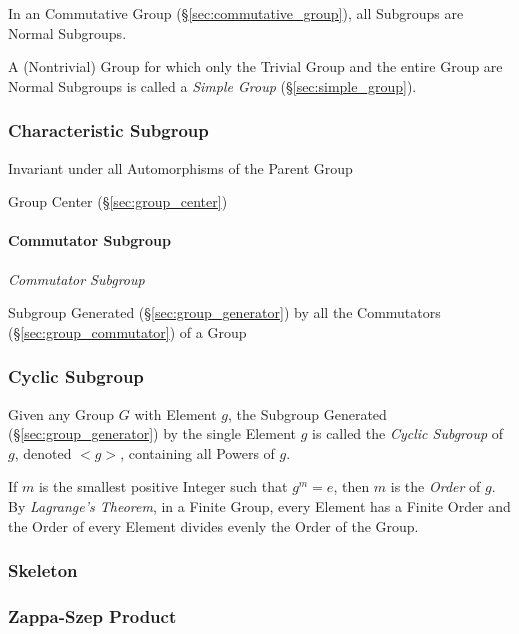In an Commutative Group (\S\ref{sec:commutative_group}), all Subgroups are
Normal Subgroups.

A (Nontrivial) Group for which only the Trivial Group and the entire Group are
Normal Subgroups is called a \emph{Simple Group} (\S\ref{sec:simple_group}).



\subsubsection{Characteristic Subgroup}\label{sec:characteristic_subgroup}

Invariant under all Automorphisms of the Parent Group

Group Center (\S\ref{sec:group_center})



\paragraph{Commutator Subgroup}\label{sec:commutator_subgroup}\hfill

\emph{Commutator Subgroup}

Subgroup Generated (\S\ref{sec:group_generator}) by all the
Commutators (\S\ref{sec:group_commutator}) of a Group



\subsubsection{Cyclic Subgroup}\label{sec:cyclic_subgroup}

Given any Group $G$ with Element $g$, the Subgroup Generated
(\S\ref{sec:group_generator}) by the single Element $g$ is called the
\emph{Cyclic Subgroup} of $g$, denoted $<g>$, containing all Powers of
$g$.

If $m$ is the smallest positive Integer such that $g^m = e$, then $m$
is the \emph{Order} of $g$. By \emph{Lagrange's Theorem}, in a Finite
Group, every Element has a Finite Order and the Order of every Element
divides evenly the Order of the Group.



\subsubsection{Skeleton}\label{sec:group_skeleton}

\subsubsection{Zappa-Szep Product}\label{sec:zappa_szep}

